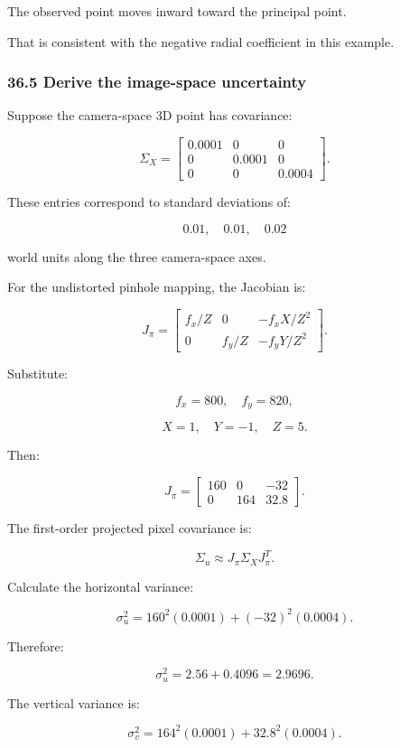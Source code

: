 The observed point moves inward toward the principal point.

That is consistent with the negative radial coefficient in this example.

\subsubsection{36.5 Derive the image-space uncertainty}\label{02-foundations-ii-ch037-derive-the-image-space-uncertainty}

Suppose the camera-space 3D point has covariance:

\[
 \Sigma_X= \begin{bmatrix} 0.0001&0&0\\ 0&0.0001&0\\ 0&0&0.0004 \end{bmatrix}.
\]

These entries correspond to standard deviations of:

\[
 0.01,\quad0.01,\quad0.02
\]

world units along the three camera-space axes.

For the undistorted pinhole mapping, the Jacobian is:

\[
 J_\pi= \begin{bmatrix} f_x/Z&0&-f_xX/Z^2\\ 0&f_y/Z&-f_yY/Z^2 \end{bmatrix}.
\]

Substitute:

\[
 f_x=800,\quad f_y=820,
\]

\[
 X=1,\quad Y=-1,\quad Z=5.
\]

Then:

\[
 \boxed{ J_\pi= \begin{bmatrix} 160&0&-32\\ 0&164&32.8 \end{bmatrix} }.
\]

The first-order projected pixel covariance is:

\[
 \Sigma_u\approx J_\pi\Sigma_XJ_\pi^T.
\]

Calculate the horizontal variance:

\[
 \sigma_u^2= 160^2(0.0001)+(-32)^2(0.0004).
\]

Therefore:

\[
 \sigma_u^2=2.56+0.4096 =\boxed{2.9696}.
\]

The vertical variance is:

\[
 \sigma_v^2= 164^2(0.0001)+32.8^2(0.0004).
\]

